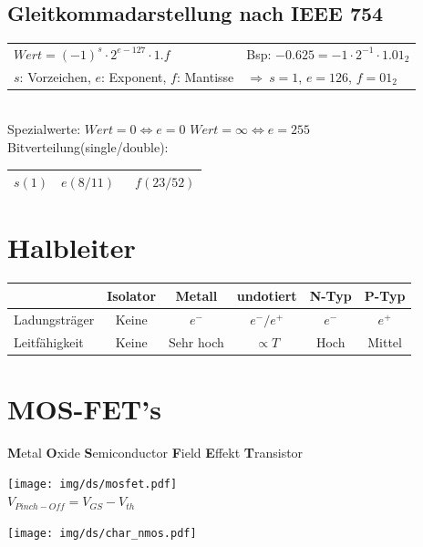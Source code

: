 \documentclass[6pt,a4paper]{scrartcl}
\newcommand{\Ra}[0]{\ensuremath{\Rightarrow}}									%
\begin{document}
\begin{multicols}{3}
	\subsection{Gleitkommadarstellung nach IEEE 754}
	\begin{tabular}{l|l}
		$Wert = (-1)^s \cdot 2^{e-127} \cdot 1.f$ & Bsp: $-0.625 = -1 \cdot 2^{-1} \cdot 1.01_2$\\
		$s$: Vorzeichen, $e$: Exponent, $f$: Mantisse & $\Ra\ s = 1$, $e = 126$, $f = 01_2$\\ 
	\end{tabular}
	\\[0.5em]
	Spezialwerte: $Wert = 0 \Leftrightarrow e=0$ \qquad $Wert = \infty \Leftrightarrow e=255$ \\
	Bitverteilung(single/double):\\
	\begin{tabular}{|c|c|c|} \hline 
		$s(1)$ & \quad $e(8/11)$ \quad\qquad & \qquad\qquad\qquad\ $f(23/52)$ \qquad\qquad\qquad\qquad \\ \hline
	\end{tabular}

\section{Halbleiter}
\begin{tabular}{l|c|c|c|c|c}
	& Isolator & Metall & undotiert & N-Typ & P-Typ \\ \hline
	Ladungsträger & Keine & $e^-$ & $e^- / e^+$ & $e^-$ & $e^+$ \\
	Leitfähigkeit & Keine & Sehr hoch & $\propto T$ & Hoch & Mittel\\  
\end{tabular}


\section{MOS-FET's}
\textbf{M}etal \textbf{O}xide \textbf{S}emiconductor \textbf{F}ield \textbf{E}ffekt \textbf{T}ransistor\\
\parbox{4.0cm}{ \texttt{[image: img/ds/mosfet.pdf]} \\ $V_{Pinch-Off} = V_{GS} - V_{th}$ } \parbox{3.0cm}{ \texttt{[image: img/ds/char\_nmos.pdf]} } 



\end{multicols}
\end{document}
